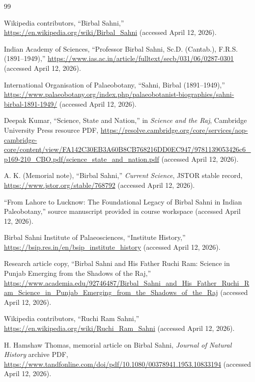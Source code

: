 \documentclass[10pt]{article}
\begin{document}
\begin{thebibliography}{99}

Wikipedia contributors, ``Birbal Sahni,'' \url{https://en.wikipedia.org/wiki/Birbal_Sahni} (accessed April 12, 2026).

Indian Academy of Sciences, ``Professor Birbal Sahni, Sc.D. (Cantab.), F.R.S. (1891--1949),'' \url{https://www.ias.ac.in/article/fulltext/secb/031/06/0287-0301} (accessed April 12, 2026).

International Organisation of Palaeobotany, ``Sahni, Birbal (1891--1949),'' \url{https://www.palaeobotany.org/index.php/palaeobotanist-biographies/sahni-birbal-1891-1949/} (accessed April 12, 2026).

Deepak Kumar, ``Science, State and Nation,'' in \textit{Science and the Raj}, Cambridge University Press resource PDF, \url{https://resolve.cambridge.org/core/services/aop-cambridge-core/content/view/FA142C30EB3A60B8CB768216DD0EC947/9781139053426c6_p169-210_CBO.pdf/science_state_and_nation.pdf} (accessed April 12, 2026).

A. K. (Memorial note), ``Birbal Sahni,'' \textit{Current Science}, JSTOR stable record, \url{https://www.jstor.org/stable/768792} (accessed April 12, 2026).

``From Lahore to Lucknow: The Foundational Legacy of Birbal Sahni in Indian Paleobotany,'' source manuscript provided in course workspace (accessed April 12, 2026).

Birbal Sahni Institute of Palaeosciences, ``Institute History,'' \url{https://bsip.res.in/en/bsip_institute_history} (accessed April 12, 2026).

Research article copy, ``Birbal Sahni and His Father Ruchi Ram: Science in Punjab Emerging from the Shadows of the Raj,'' \url{https://www.academia.edu/92746487/Birbal_Sahni_and_His_Father_Ruchi_Ram_Science_in_Punjab_Emerging_from_the_Shadows_of_the_Raj} (accessed April 12, 2026).

Wikipedia contributors, ``Ruchi Ram Sahni,'' \url{https://en.wikipedia.org/wiki/Ruchi_Ram_Sahni} (accessed April 12, 2026).

H. Hamshaw Thomas, memorial article on Birbal Sahni, \textit{Journal of Natural History} archive PDF, \url{https://www.tandfonline.com/doi/pdf/10.1080/00378941.1953.10833194} (accessed April 12, 2026).


\end{thebibliography}
\end{document}
